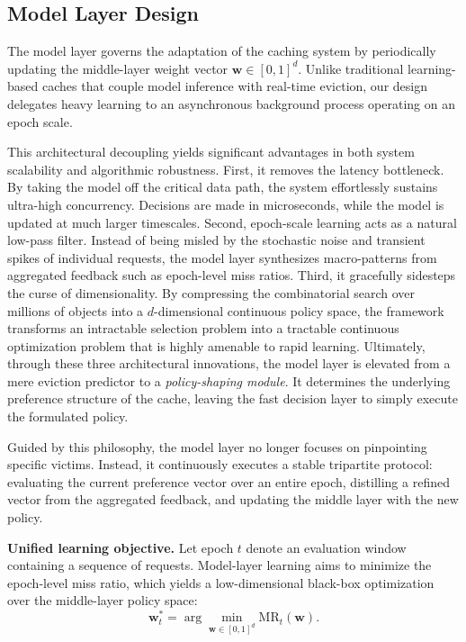 \documentclass[10pt,journal]{IEEEtran}
\theoremstyle{slantedlemma}
\begin{document}
\subsection{Model Layer Design}

The model layer governs the adaptation of the caching system by periodically updating the middle-layer weight vector $\mathbf{w}\in[0,1]^d$. Unlike traditional learning-based caches that couple model inference with real-time eviction, our design delegates heavy learning to an asynchronous background process operating on an epoch scale. 

This architectural decoupling yields significant advantages in both system scalability and algorithmic robustness. First, it removes the latency bottleneck. By taking the model off the critical data path, the system effortlessly sustains ultra-high concurrency. Decisions are made in microseconds, while the model is updated at much larger timescales. Second, epoch-scale learning acts as a natural low-pass filter. Instead of being misled by the stochastic noise and transient spikes of individual requests, the model layer synthesizes macro-patterns from aggregated feedback such as epoch-level miss ratios. Third, it gracefully sidesteps the curse of dimensionality. By compressing the combinatorial search over millions of objects into a $d$-dimensional continuous policy space, the framework transforms an intractable selection problem into a tractable continuous optimization problem that is highly amenable to rapid learning. Ultimately, through these three architectural innovations, the model layer is elevated from a mere eviction predictor to a \emph{policy-shaping module}. It determines the underlying preference structure of the cache, leaving the fast decision layer to simply execute the formulated policy.

Guided by this philosophy, the model layer no longer focuses on pinpointing specific victims. Instead, it continuously executes a stable tripartite protocol: evaluating the current preference vector over an entire epoch, distilling a refined vector from the aggregated feedback, and updating the middle layer with the new policy. 

\textbf{Unified learning objective.}
Let epoch $t$ denote an evaluation window containing a sequence of requests.
Model-layer learning aims to minimize the epoch-level miss ratio,
which yields a low-dimensional black-box optimization over the middle-layer
policy space:
\begin{equation}
\mathbf{w}_t^* = \arg\min_{\mathbf{w}\in[0,1]^d} \mathrm{MR}_t(\mathbf{w}).
\label{eq:model-argmin}
\end{equation}
\end{document}
